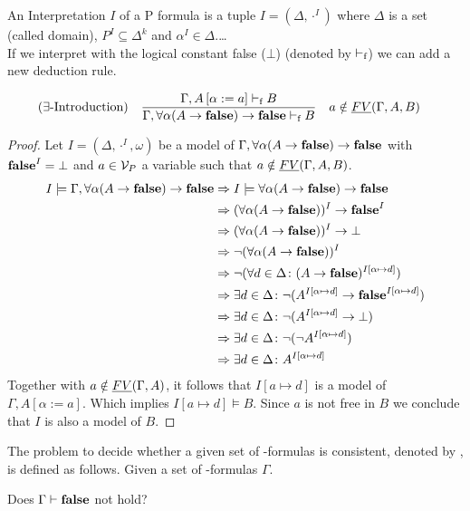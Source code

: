 An Interpretation $I$ of a P formula is a tuple $I=(\Delta,\cdot^I)$ where $\Delta$ is a set (called domain), $P^I\subseteq\Delta^k$ and $\alpha^I\in\Delta$.\dots\\
If we interpret \false{} with the logical constant false ($\bot$) (denoted by $\vdash_\text{f}$) we can add a new deduction rule.
\begin{mdframed}
	\begin{align*}
		  & (\exists\text{-Introduction}) &   & \frac 
		{\Gamma,A\left[\alpha:=a\right]\vdash_\text{f} B}
		{\Gamma,\forall\alpha(A\to\textbf{false})\to\textbf{false}\vdash_\text{f} B} && a\notin\emph{FV}(\Gamma,A,B)
	\end{align*}
\end{mdframed}
\begin{proof}
	Let $I=(\Delta,\cdot^I,\omega)$ be a model of $\Gamma,\forall\alpha(A\to\textbf{false})\to\textbf{false}$ with $\textbf{false}^I=\bot$ and $a\in\mathcal{V}_P$ a variable such that $a\notin\emph{FV}(\Gamma,A,B)$.
	\begin{align*}
		I\models\Gamma,\forall\alpha(A\to\textbf{false})\to\textbf{false} & \Rightarrow I\models\forall\alpha(A\to\textbf{false})\to\textbf{false}                                                          \\
        & \Rightarrow (\forall\alpha(A\to\textbf{false}))^I\to\textbf{false}^I                                                            \\
        & \Rightarrow (\forall\alpha(A\to\textbf{false}))^I\to\bot                                                                \\
        & \Rightarrow \neg(\forall\alpha(A\to\textbf{false}))^I                                                                   \\
        & \Rightarrow \neg(\forall d\in\Delta\colon(A\to\textbf{false})^{I\left[\alpha\mapsto d\right]})                               \\
        & \Rightarrow \exists d\in\Delta\colon\neg(A^{I\left[\alpha\mapsto d\right]}\to\textbf{false}^{I\left[\alpha\mapsto d\right]}) \\
        & \Rightarrow \exists d\in\Delta\colon\neg(A^{I\left[\alpha\mapsto d\right]}\to\bot)                                   \\
        & \Rightarrow \exists d\in\Delta\colon\neg(\neg A^{I\left[\alpha\mapsto d\right]})                                     \\
        & \Rightarrow \exists d\in\Delta\colon A^{I\left[\alpha\mapsto d\right]}
	\end{align*}
	Together with $a\notin\emph{FV}(\Gamma,A)$, it follows that $I\left[a\mapsto d\right]$ is a model of $\Gamma,A\left[\alpha:=a\right]$. Which implies $I\left[a\mapsto d\right]\models B$.	Since $a$ is not free in $B$ we conclude that $I$ is also a model of $B$.
\end{proof}
\begin{definition}
	The problem to decide whether a given set of \SysP-formulas is consistent, denoted by \PCons, is defined as follows.
	Given a set of \SysP-formulas $\Gamma$. 
	\begin{center}
		Does $\Gamma\vdash\textbf{false}$ not hold?
	\end{center}
\end{definition}
